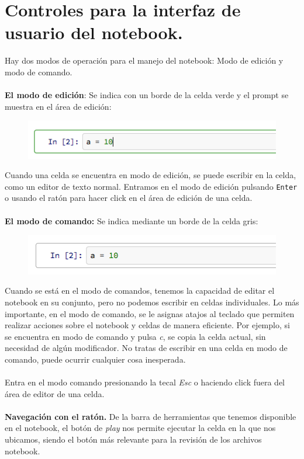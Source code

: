 \documentclass[12pt]{article}
\begin{document}
\section{Controles para la interfaz de usuario del notebook.}
Hay dos modos de operación para el manejo del notebook: Modo de edición y modo de comando.
\\
\\
\textbf{El modo de edición}: Se indica con un borde de la celda verde y el prompt se muestra en el área de edición: 
\begin{figure}[H]
	\centering
	\includegraphics[scale=0.6]{Imagenes/ipython_notebook_09.png}
\end{figure}
Cuando una celda se encuentra en modo de edición, se puede escribir en la celda, como un editor de texto normal. Entramos en el modo de edición pulsando \texttt{Enter} o usando el ratón para hacer click en el área de edición de una celda. 
\\
\\
\textbf{El modo de comando:} Se indica mediante un borde de la celda gris: 
\begin{figure}[H]
	\centering
	\includegraphics[scale=0.6]{Imagenes/ipython_notebook_10.png}
\end{figure}
Cuando se está en el modo de comandos, tenemos la capacidad de editar el notebook en su conjunto, pero no podemos escribir en celdas individuales. Lo más importante, en el modo de comando, se le asignas atajos al teclado que permiten realizar acciones sobre el notebook y celdas de manera eficiente. Por ejemplo, si se encuentra en modo de comando y pulsa \emph{c}, se copia la celda actual, sin necesidad de algún modificador. No tratas de escribir en una celda en modo de comando, puede ocurrir cualquier cosa inesperada.
\\
\\
Entra en el modo comando presionando la tecal \emph{Esc} o haciendo click fuera del área de editor de una celda. 
\\
\\
\textbf{Navegación con el ratón.} De la barra de herramientas que tenemos disponible en el notebook, el botón de \emph{play} nos permite ejecutar la celda en la que nos ubicamos, siendo el botón más relevante para la revisión de los archivos notebook.
\end{document}

